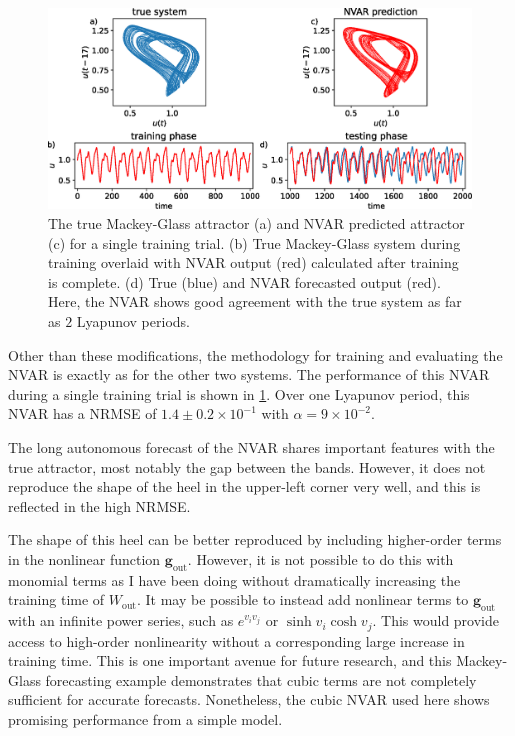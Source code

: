 \begin{figure}
  \includegraphics[width=\textwidth]{figures/nvar-predict-mackey-glass}
  \caption{The true Mackey-Glass attractor (a) and NVAR predicted
    attractor (c) for a single training trial. (b) True Mackey-Glass
    system during training overlaid with NVAR output (red) calculated
    after training is complete. (d) True (blue) and NVAR forecasted
    output (red). Here, the NVAR shows good agreement with the true
    system as far as $2$ Lyapunov periods.}
  \label{fig:nvar-predict-mackey-glass}
\end{figure}

Other than these modifications, the methodology for training and
evaluating the NVAR is exactly as for the other two systems. The
performance of this NVAR during a single training trial is shown in
\cref{fig:nvar-predict-mackey-glass}. Over one Lyapunov period, this
NVAR has a NRMSE of $1.4\pm0.2\times10^{-1}$ with $\alpha =
9\times10^{-2}$.

The long autonomous forecast of the NVAR shares important features
with the true attractor, most notably the gap between the
bands. However, it does not reproduce the shape of the heel in the
upper-left corner very well, and this is reflected in the high NRMSE.


The shape of this heel can be better reproduced by including
higher-order terms in the nonlinear function
$\bm{g}_\text{out}$. However, it is not possible to do this with
monomial terms as I have been doing without dramatically increasing
the training time of $W_\text{out}$. It may be possible to instead add
nonlinear terms to $\bm{g}_\text{out}$ with an infinite power series,
such as $e^{v_iv_j}$ or $\sinh{v_i}\cosh{v_j}$. This would provide
access to high-order nonlinearity without a corresponding large increase in training
time. This is one important avenue for future research, and this
Mackey-Glass forecasting example demonstrates that cubic terms are not
completely sufficient for accurate forecasts. Nonetheless, the cubic
NVAR used here shows promising performance from a simple model.

